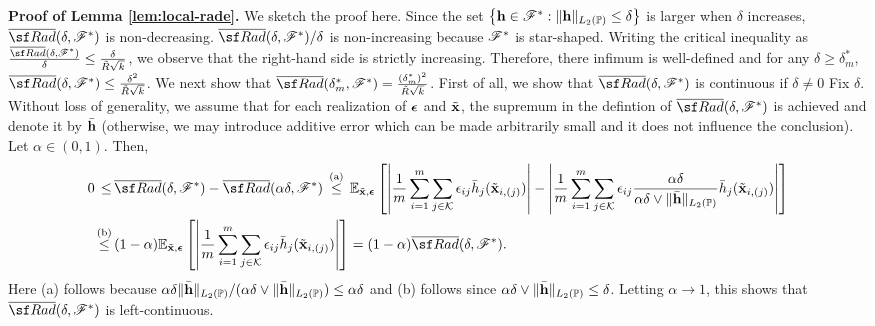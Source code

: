 {     \noindent \textbf{Proof of Lemma \ref{lem:local-rade}.}
        We sketch the proof here. Since the set $\left\{\mathbf{h} \in \mathscr{F}^*: \lVert \mathbf{h}\rVert_{L_2(\mathbb{P})}\leq \delta \right\}$ is larger when $\delta$ increases,  $\overline{\sf Rad}(\delta, \Fscr^*)$ is non-decreasing. 
        $\overline{\sf Rad}(\delta, \Fscr^*)/\delta$ is non-increasing because $\mathscr{F}^*$ is star-shaped. 
        Writing the critical inequality as $\frac{\overline{\sf Rad}(\delta, \Fscr^*)}{\delta}\leq  \frac{\delta}{\tilde{R}\sqrt{k}}$, we observe that the right-hand side is strictly increasing. Therefore, there infimum is well-defined and for any $\delta \geq \delta_m^*$, $\overline{\sf Rad}(\delta, \Fscr^*)\leq  \frac{\delta^2}{\tilde{R}\sqrt{k}}$. 
        We next show that $\overline{\sf Rad}(\delta_m^*, \Fscr^*) = \frac{(\delta^*_m)^2}{\tilde{R}\sqrt{k}}$. 
        First of all, we show that $\overline{\sf Rad}(\delta, \Fscr^*)$ is continuous if $\delta \neq 0$ 
        Fix $\delta$. 
        Without loss of generality, we assume that for each realization of $\bm{\epsilon}$ and $\tilde{\mathbf{x}}$, the supremum in the defintion of $\overline{\sf Rad}(\delta, \Fscr^*)$ is achieved and denote it by $\bar{\mathbf{h}}$ (otherwise, we may introduce additive error which can be made arbitrarily small and it does not influence the conclusion).
        Let $\alpha \in (0,1)$. 
        Then,  
        \begin{align*}
                  0 \,\leq\, & \overline{\sf Rad}(\delta, \Fscr^*) - \overline{\sf Rad}(\alpha\delta, \Fscr^*)\,\stackrel{\text{(a)}}{\leq}\, \E_{\tilde{\x},\epsvec}\left[
    \left|
    \frac{1}{m}\sum_{i=1}^m\sum_{j \in \Kscr}\epsilon_{ij}\bar{h}_j(\tilde{\x}_{i,(j)})
    \right| - 
    \left|
    \frac{1}{m}\sum_{i=1}^m\sum_{j \in \Kscr}\epsilon_{ij}\frac{\alpha\delta}{\alpha\delta\vee\lVert \bar{\hvec}\rVert_{L_2(\Prob)}}\bar{h}_j(\tilde{\x}_{i,(j)})
    \right| 
    \right]\\
     \,\stackrel{\text{(b)}}{\leq}\, & (1 - \alpha)  \E_{\tilde{\x},\epsvec}\left[
    \left|
    \frac{1}{m}\sum_{i=1}^m\sum_{j \in \Kscr}\epsilon_{ij}\bar{h}_j(\tilde{\x}_{i,(j)})
    \right| 
    \right] = (1 - \alpha)  \overline{\sf Rad}(\delta, \Fscr^*).
        \end{align*}
    Here (a) follows because $\alpha\delta\lVert \bar{\mathbf{h}}\rVert_{L_2(\mathbb{P})}/(\alpha\delta\vee\lVert \bar{\mathbf{h}}\rVert_{L_2(\mathbb{P})})\leq \alpha\delta$ and (b) follows since $\alpha \delta \vee \lVert \bar{\mathbf{h}}\rVert_{L_2(\mathbb{P})} \leq \delta$. 
    Letting $\alpha \rightarrow 1$, this shows that $\overline{\sf Rad}(\delta, \Fscr^*)$  is left-continuous. 
}
